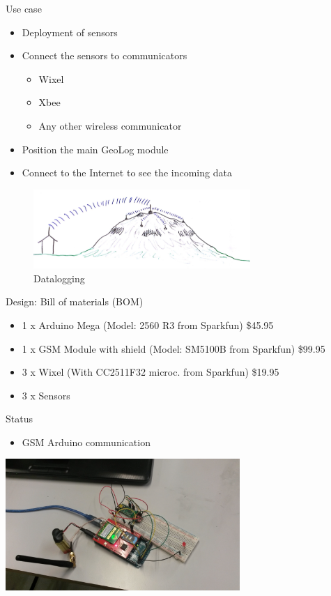 \documentclass{beamer}
\begin{document}
\begin{frame}{Use case}
	\begin{itemize}
	\item Deployment of sensors
	\item Connect the sensors to communicators
		\begin{itemize}
		\item Wixel
		\item Xbee
		\item Any other wireless communicator
		\end{itemize}
	\item Position the main GeoLog module
	\item Connect to the Internet to see the incoming data
	\end{itemize}
	\begin{figure}
			\centering
	        \includegraphics[height=3cm]{graphics/GeoLog.png}
	        \caption{Datalogging\cite{Helgason2014}}
	\end{figure}

\end{frame}

\begin{frame}{Design: Bill of materials (BOM)}

\begin{itemize}
\item 1 x Arduino Mega (Model: 2560 R3 from Sparkfun) \$45.95
\item 1 x GSM Module with shield  (Model: SM5100B from Sparkfun) \$99.95
\item 3 x Wixel   (With CC2511F32 microc. from Sparkfun) \$19.95
\item 3 x Sensors
\end{itemize}
\end{frame}

\begin{frame}{Status}
\begin{itemize}
\item GSM Arduino communication
\end{itemize}
\centering
\includegraphics[height=5cm]{graphics/gsmArduino.jpg}
\end{frame}
\end{document}

